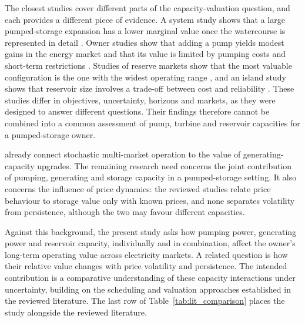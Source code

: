 The closest studies cover different parts of the capacity-valuation
question, and each provides a different piece of evidence. A system
study shows that a large pumped-storage expansion has a lower marginal
value once the watercourse is represented in detail
\citep{helseth2017}. Owner studies show that adding a pump yields modest
gains in the energy market and that its value is limited by pumping
costs and short-term restrictions
\citep{ak2019quantifying,alic2023optimal,schuller2024practical}. Studies
of reserve markets show that the most valuable configuration is the one
with the widest operating range \citep{helseth2017iet,chazarra2017},
and an island study shows that reservoir size involves a trade-off
between cost and reliability \citep{zisos2023mixing}. These studies
differ in objectives, uncertainty, horizons and markets, as they were
designed to answer different questions. Their findings therefore cannot
be combined into a common assessment of pump, turbine and reservoir
capacities for a pumped-storage owner.

\citet{bore2026assessing} already connect stochastic multi-market
operation to the value of generating-capacity upgrades. The remaining
research need concerns the joint contribution of pumping, generating and
storage capacity in a pumped-storage setting. It also concerns the
influence of price dynamics: the reviewed studies relate price behaviour
to storage value only with known prices, and none separates volatility
from persistence, although the two may favour different capacities.

Against this background, the present study asks how pumping power,
generating power and reservoir capacity, individually and in
combination, affect the owner's long-term operating value across
electricity markets. A related question is how their relative value
changes with price volatility and persistence. The intended contribution
is a comparative understanding of these capacity interactions under
uncertainty, building on the scheduling and valuation approaches
established in the reviewed literature. The last row of
Table~\ref{tab:lit_comparison} places the study alongside the reviewed
literature.

